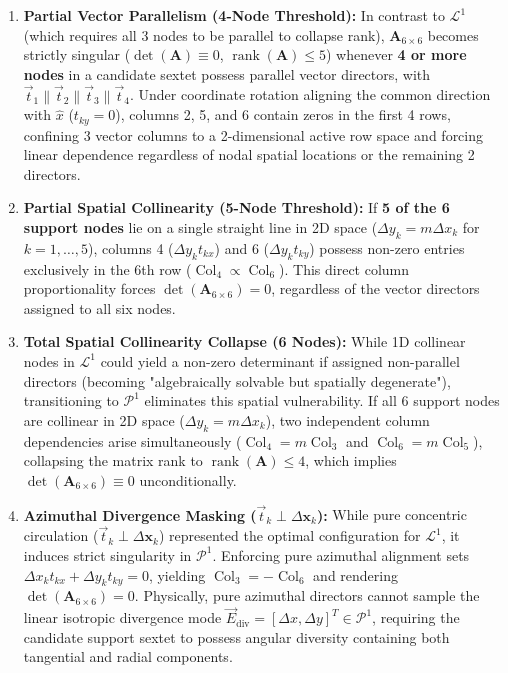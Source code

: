 \documentclass[preprint,12pt]{elsarticle}
\begin{document}
\begin{enumerate}
    \item \textbf{Partial Vector Parallelism (4-Node Threshold):} In contrast to $\mathcal{L}^1$ (which requires all 3 nodes to be parallel to collapse rank), $\mathbf{A}_{6 \times 6}$ becomes strictly singular ($\det(\mathbf{A}) \equiv 0$, $\operatorname{rank}(\mathbf{A}) \le 5$) whenever \textbf{4 or more nodes} in a candidate sextet possess parallel vector directors, with $\vec{t}_1 \parallel \vec{t}_2 \parallel \vec{t}_3 \parallel \vec{t}_4$. Under coordinate rotation aligning the common direction with $\hat{x}$ ($t_{ky} = 0$), columns 2, 5, and 6 contain zeros in the first 4 rows, confining 3 vector columns to a 2-dimensional active row space and forcing linear dependence regardless of nodal spatial locations or the remaining 2 directors.

    \item \textbf{Partial Spatial Collinearity (5-Node Threshold):} If \textbf{5 of the 6 support nodes} lie on a single straight line in 2D space ($\Delta y_k = m \Delta x_k$ for $k=1,\dots,5$), columns 4 ($\Delta y_k t_{kx}$) and 6 ($\Delta y_k t_{ky}$) possess non-zero entries exclusively in the 6th row ($\operatorname{Col}_4 \propto \operatorname{Col}_6$). This direct column proportionality forces $\det(\mathbf{A}_{6 \times 6}) = 0$, regardless of the vector directors assigned to all six nodes.

    \item \textbf{Total Spatial Collinearity Collapse (6 Nodes):} While 1D collinear nodes in $\mathcal{L}^1$ could yield a non-zero determinant if assigned non-parallel directors (becoming "algebraically solvable but spatially degenerate"), transitioning to $\mathcal{P}^1$ eliminates this spatial vulnerability. If all 6 support nodes are collinear in 2D space ($\Delta y_k = m \Delta x_k$), two independent column dependencies arise simultaneously ($\operatorname{Col}_4 = m \operatorname{Col}_3$ and $\operatorname{Col}_6 = m \operatorname{Col}_5$), collapsing the matrix rank to $\operatorname{rank}(\mathbf{A}) \le 4$, which implies $\det(\mathbf{A}_{6 \times 6}) \equiv 0$ unconditionally.

    \item \textbf{Azimuthal Divergence Masking ($\vec{t}_k \perp \Delta \mathbf{x}_k$):} While pure concentric circulation ($\vec{t}_k \perp \Delta \mathbf{x}_k$) represented the optimal configuration for $\mathcal{L}^1$, it induces strict singularity in $\mathcal{P}^1$. Enforcing pure azimuthal alignment sets $\Delta x_k t_{kx} + \Delta y_k t_{ky} = 0$, yielding $\operatorname{Col}_3 = -\operatorname{Col}_6$ and rendering $\det(\mathbf{A}_{6 \times 6}) = 0$. Physically, pure azimuthal directors cannot sample the linear isotropic divergence mode $\vec{E}_{\mathrm{div}} = [\Delta x, \Delta y]^T \in \mathcal{P}^1$, requiring the candidate support sextet to possess angular diversity containing both tangential and radial components.
\end{enumerate}
\end{document}

